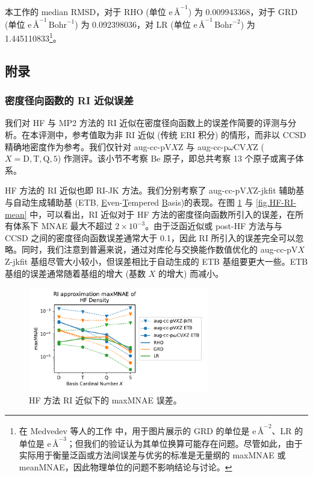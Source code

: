 本工作的 median RMSD，对于 RHO (单位 $\text{e} \, \text{\AA}^{-1}$) 为 0.009943368，对于 GRD (单位 $\text{e} \, \text{\AA}^{-1} \, \text{Bohr}^{-1}$) 为 0.092398036，对 LR (单位 $\text{e} \, \text{\AA}^{-1} \, \text{Bohr}^{-2}$) 为 1.445110833\footnote{在 Medvedev 等人的工作\cite{Medvedev-Lyssenko.S.2017} 中，用于图片展示的 GRD 的单位是 $\text{e} \, \text{\AA}^{-2}$、LR 的单位是 $\text{e} \, \text{\AA}^{-3}$；但我们的验证认为其单位换算可能存在问题。尽管如此，由于实际用于衡量泛函或方法间误差与优劣的标准是无量纲的 maxMNAE 或 meanMNAE，因此物理单位的问题不影响结论与讨论。}。




\newpage

\subsection{附录}

\subsubsection{密度径向函数的 RI 近似误差}

我们对 HF 与 MP2 方法的 RI 近似在密度径向函数上的误差作简要的评测与分析。在本评测中，参考值取为非 RI 近似 (传统 ERI 积分) 的情形，而非以 CCSD 精确地密度作为参考。我们仅针对 aug-cc-pV$X$Z 与 aug-cc-p$\omega$CV$X$Z ($X=\mathrm{D,T,Q,5}$) 作测评。该小节不考察 Be 原子，即总共考察 13 个原子或离子体系。

HF 方法的 RI 近似也即 RI-JK 方法。我们分别考察了 aug-cc-pV$X$Z-jkfit 辅助基\cite{Weigend-Weigend.PCCP.2002}与自动生成辅助基 (ETB, \underline{E}ven-\underline{T}empered \underline{B}asis)\cite{Stoychev-Neese.JCTC.2017}的表现。在图 \ref{fig.HF-RI-err} 与 \ref{fig.HF-RI-mean} 中，可以看出，RI 近似对于 HF 方法的密度径向函数所引入的误差，在所有体系下 MNAE 最大不超过 $2 \times 10^{-3}$。由于泛函近似或 post-HF 方法与与 CCSD 之间的密度径向函数误差通常大于 0.1，因此 RI 所引入的误差完全可以忽略。同时，我们注意到普遍来说，通过对库伦与交换能作数值优化的 aug-cc-pV$X$Z-jkfit 基组尽管大小较小，但误差相比于自动生成的 ETB 基组要更大一些。ETB 基组的误差通常随着基组的增大 (基数 $X$ 的增大) 而减小。

\begin{figure}[h]
  \centering
  \caption{HF 方法 RI 近似下的 maxMNAE 误差。}
  \label{fig.HF-RI-err}
  \includegraphics[width=0.7\textwidth]{assets/HF-RI-err.pdf}
\end{figure}

